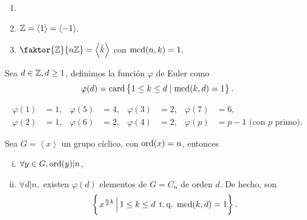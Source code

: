 \begin{example}
    \begin{enumerate}[1.]
        \item[]
        \item $\mathbb{Z} = \left< 1 \right> = \left< -1 \right>$.
        \item $\faktor{\z}{n\z} = \left< \bar{k} \right>$ con $\operatorname{mcd}(n, k) = 1$.
    \end{enumerate}
\end{example}

\begin{defi}
    Sea $d \in \mathbb{Z}, d \geq 1$, definimos la función $\varphi$ de Euler como
    \[
        \varphi(d) = \operatorname{card} \left\{ 1 \leq k \leq d \mid \operatorname{mcd}(k, d) = 1\right\}.
    \]
\end{defi}

\begin{example}
    \begin{align*}
        \varphi(1) &= 1, & \varphi(5) &= 4, & \varphi(3) &= 2, & \varphi(7) &= 6, \\
        \varphi(2) &= 1, & \varphi(6) &= 2, & \varphi(4) &= 2, & \varphi(p) &= p-1 \text{ (con } p \text{ primo).} 
    \end{align*}
\end{example}

\begin{prop}\label{prop:euler}
    Sea $G = \left< x \right>$ un grupo cíclico, con $\operatorname{ord}(x) = n$, entonces
    \begin{enumerate}[i)]
        \item $\forall y \in G, \operatorname{ord}(y) \vert n$,
        \item $\forall d \vert n,$ existen $\varphi(d)$ elementos de $G = C_n$ de orden $d$. De hecho, son
            \[
                \left\{\left. x^{\frac{n}{d} k} \,\right\vert 1 \leq k \leq d \operatorname{\;t.q.\;} \operatorname{mcd}(k, d) = 1\right\}.
            \]
    \end{enumerate}
\end{prop}

